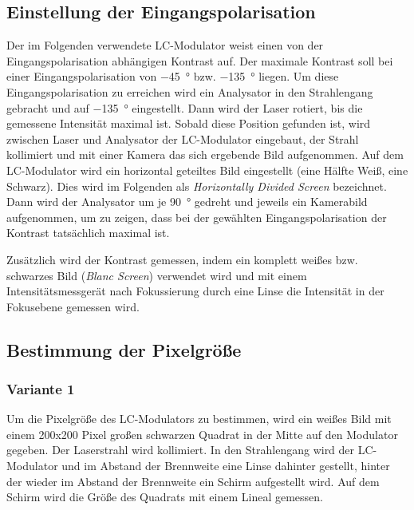 \documentclass[
	a4paper,
	12pt,
	pagesize,
	ngerman
]{scrartcl}
\begin{document}
	\subsection{Einstellung der Eingangspolarisation}
	Der im Folgenden verwendete LC-Modulator weist einen von der Eingangspolarisation abhängigen Kontrast auf.
	Der maximale Kontrast soll bei einer Eingangspolarisation von \SI{-45}{\degree} bzw. \SI{-135}{\degree} liegen.
	Um diese Eingangspolarisation zu erreichen wird ein Analysator in den Strahlengang gebracht und auf \SI{-135}{\degree} eingestellt.
	Dann wird der Laser rotiert, bis die gemessene Intensität maximal ist.
	Sobald diese Position gefunden ist, wird zwischen Laser und Analysator der LC-Modulator eingebaut, der Strahl kollimiert und mit einer Kamera das sich ergebende Bild aufgenommen.
	Auf dem LC-Modulator wird ein horizontal geteiltes Bild eingestellt (eine Hälfte Weiß, eine Schwarz).
	Dies wird im Folgenden als \textit{Horizontally Divided Screen} bezeichnet.
	Dann wird der Analysator um je \SI{90}{\degree} gedreht und jeweils ein Kamerabild aufgenommen, um zu zeigen, dass bei der gewählten Eingangspolarisation der Kontrast tatsächlich maximal ist. %

	Zusätzlich wird der Kontrast gemessen, indem ein komplett weißes bzw. schwarzes Bild (\textit{Blanc Screen}) verwendet wird und mit einem Intensitätsmessgerät nach Fokussierung durch eine Linse die Intensität in der Fokusebene gemessen wird.

	\subsection{Bestimmung der Pixelgröße}
		\subsubsection*{Variante 1}
		Um die Pixelgröße des LC-Modulators zu bestimmen, wird ein weißes Bild mit einem 200x200 Pixel großen schwarzen Quadrat in der Mitte auf den Modulator gegeben.
		Der Laserstrahl wird kollimiert.
		In den Strahlengang wird der LC-Modulator und im Abstand der Brennweite eine Linse dahinter gestellt, hinter der wieder im Abstand der Brennweite ein Schirm aufgestellt wird.
		Auf dem Schirm wird die Größe des Quadrats mit einem Lineal gemessen. %
\end{document}
